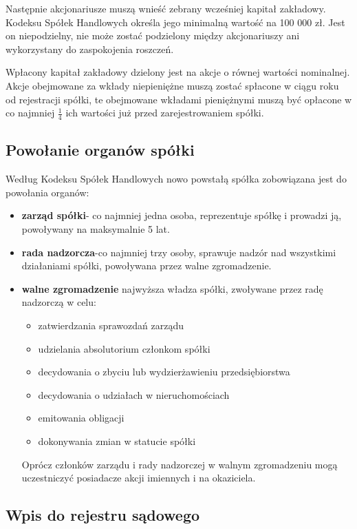 \documentclass[11pt]{article}
\begin{document}
	Następnie akcjonariusze muszą wnieść zebrany wcześniej kapitał zakładowy. Kodeksu Spółek Handlowych określa jego minimalną wartość na 100 000 zł. Jest on niepodzielny, nie może zostać podzielony między akcjonariuszy ani wykorzystany do zaspokojenia roszczeń.
	
	Wpłacony kapitał zakładowy dzielony jest na akcje o równej wartości nominalnej. Akcje obejmowane za wkłady niepieniężne muszą zostać spłacone w ciągu roku od rejestracji spółki, te obejmowane wkładami pieniężnymi muszą być opłacone w co najmniej $\frac{1}{4}$ ich wartości już przed zarejestrowaniem spółki.
	
	\subsection{Powołanie organów spółki}
	Według Kodeksu Spółek Handlowych nowo powstałą spółka zobowiązana jest do powołania organów:
	
	\begin{itemize}
	
	\item \textbf{zarząd spółki}- co najmniej jedna osoba, reprezentuje spółkę i prowadzi ją, powoływany na maksymalnie 5 lat.
	\item \textbf{rada nadzorcza}-co najmniej trzy osoby, sprawuje nadzór nad wszystkimi działaniami spółki, powoływana przez walne zgromadzenie.
	\item \textbf{walne zgromadzenie} najwyższa władza spółki, zwoływane przez radę nadzorczą w celu:
	\begin{itemize}

	\item zatwierdzania sprawozdań zarządu
	\item udzielania absolutorium członkom spółki
	\item decydowania o zbyciu lub wydzierżawieniu przedsiębiorstwa
	\item decydowania o udziałach w nieruchomościach
	\item emitowania obligacji
	\item dokonywania zmian w statucie spółki
	
	\end{itemize}
	
	Oprócz członków zarządu i rady nadzorczej w walnym zgromadzeniu mogą uczestniczyć posiadacze akcji imiennych i na okaziciela.
	
	\end{itemize}
	
	\subsection{Wpis do rejestru sądowego}
	
\end{document}
